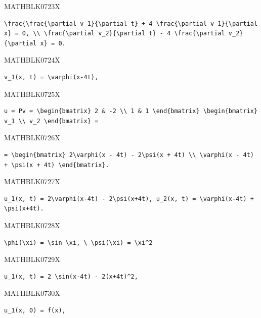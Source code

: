 \documentclass[
  ukrainian,
]{article}
\begin{document}
MATHBLK0723X

\begin{verbatim}
\frac{\frac{\partial v_1}{\partial t} + 4 \frac{\partial v_1}{\partial x} = 0, \\ \frac{\partial v_2}{\partial t} - 4 \frac{\partial v_2}{\partial x} = 0.
\end{verbatim}

MATHBLK0724X

\begin{verbatim}
v_1(x, t) = \varphi(x-4t),
\end{verbatim}

MATHBLK0725X

\begin{verbatim}
u = Pv = \begin{bmatrix} 2 & -2 \\ 1 & 1 \end{bmatrix} \begin{bmatrix} v_1 \\ v_2 \end{bmatrix} =
\end{verbatim}

MATHBLK0726X

\begin{verbatim}
= \begin{bmatrix} 2\varphi(x - 4t) - 2\psi(x + 4t) \\ \varphi(x - 4t) + \psi(x + 4t) \end{bmatrix}.
\end{verbatim}

MATHBLK0727X

\begin{verbatim}
u_1(x, t) = 2\varphi(x-4t) - 2\psi(x+4t), u_2(x, t) = \varphi(x-4t) + \psi(x+4t).
\end{verbatim}

MATHBLK0728X

\begin{verbatim}
\phi(\xi) = \sin \xi, \ \psi(\xi) = \xi^2
\end{verbatim}

MATHBLK0729X

\begin{verbatim}
u_1(x, t) = 2 \sin(x-4t) - 2(x+4t)^2,
\end{verbatim}

MATHBLK0730X

\begin{verbatim}
u_1(x, 0) = f(x),
\end{verbatim}
\end{document}
